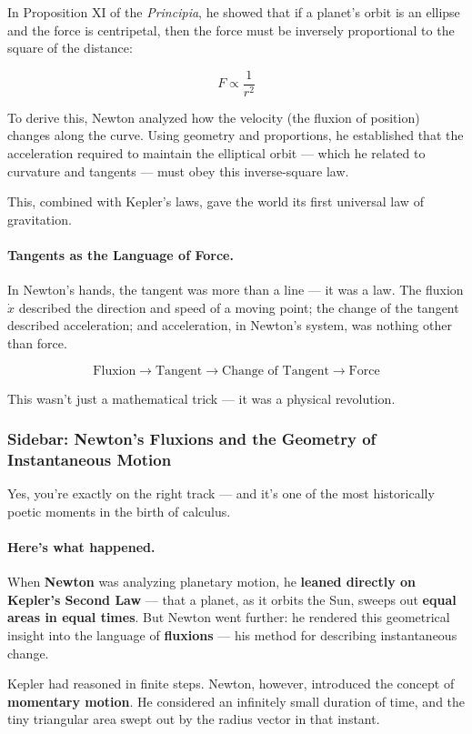 In Proposition XI of the \textit{Principia}, he showed that if a planet’s orbit is an ellipse and the force is centripetal, then the force must be inversely proportional to the square of the distance:

\[
F \propto \frac{1}{r^2}
\]

To derive this, Newton analyzed how the velocity (the fluxion of position) changes along the curve. Using geometry and proportions, he established that the acceleration required to maintain the elliptical orbit — which he related to curvature and tangents — must obey this inverse-square law.

This, combined with Kepler’s laws, gave the world its first universal law of gravitation.

\paragraph{Tangents as the Language of Force.} In Newton’s hands, the tangent was more than a line — it was a law. The fluxion $\dot{x}$ described the direction and speed of a moving point; the change of the tangent described acceleration; and acceleration, in Newton’s system, was nothing other than force.

\[
\text{Fluxion} \rightarrow \text{Tangent} \rightarrow \text{Change of Tangent} \rightarrow \text{Force}
\]

This wasn’t just a mathematical trick — it was a physical revolution.


\subsubsection*{Sidebar: Newton’s Fluxions and the Geometry of Instantaneous Motion}

Yes, you’re exactly on the right track — and it's one of the most historically poetic moments in the birth of calculus.

\paragraph{Here’s what happened.} When \textbf{Newton} was analyzing planetary motion, he \textbf{leaned directly on Kepler’s Second Law} — that a planet, as it orbits the Sun, sweeps out \textbf{equal areas in equal times}. But Newton went further: he rendered this geometrical insight into the language of \textbf{fluxions} — his method for describing instantaneous change.

Kepler had reasoned in finite steps. Newton, however, introduced the concept of \textbf{momentary motion}. He considered an infinitely small duration of time, and the tiny triangular area swept out by the radius vector in that instant.

